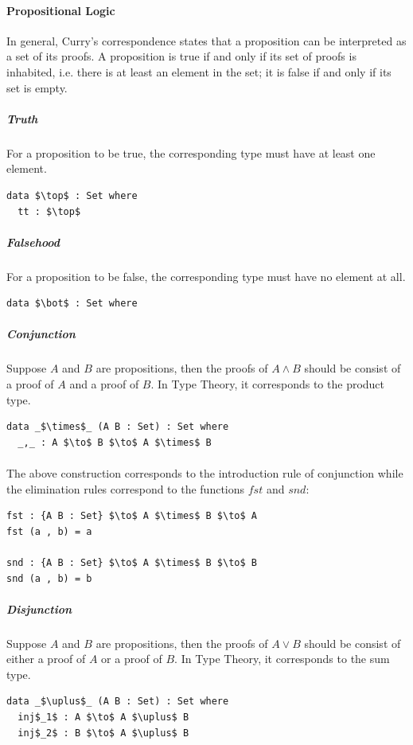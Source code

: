 \documentclass[twoside,openright,final]{bhamthesis}
\begin{document}
\paragraph{Propositional Logic} In general, Curry's correspondence
states that a proposition can be interpreted as a set of its proofs. A
proposition is true if and only if its set of proofs is inhabited,
i.e. there is at least an element in the set; it is false if and only
if its set is empty. 

\subparagraph{Truth} For a proposition to be true, the corresponding
type must have at least one element. 
\begin{lstlisting}[mathescape=true,xleftmargin=.3\textwidth]
data $\top$ : Set where
  tt : $\top$
\end{lstlisting} 

\subparagraph{Falsehood} For a proposition to be false, the corresponding
type must have no element at all. 
\begin{lstlisting}[mathescape=true,xleftmargin=.3\textwidth]
data $\bot$ : Set where
\end{lstlisting} 

\subparagraph{Conjunction} Suppose \(A\) and \(B\) are propositions, then the
proofs of \(A \wedge B\) should be consist of
a proof of \(A\) and a proof of \(B\). In Type Theory, it corresponds
to the product type. 
\begin{lstlisting}[mathescape=true,xleftmargin=.3\textwidth]
data _$\times$_ (A B : Set) : Set where
  _,_ : A $\to$ B $\to$ A $\times$ B
\end{lstlisting} 

\paragraph{} The above construction corresponds to the introduction rule of
conjunction while the elimination rules correspond to the functions
\(fst\) and \(snd\):
\begin{lstlisting}[mathescape=true,xleftmargin=.3\textwidth]
fst : {A B : Set} $\to$ A $\times$ B $\to$ A
fst (a , b) = a

snd : {A B : Set} $\to$ A $\times$ B $\to$ B
snd (a , b) = b
\end{lstlisting} 

\subparagraph{Disjunction} Suppose \(A\) and \(B\) are propositions, then the
proofs of \(A \vee B\) should be consist of either a proof of \(A\) or a
proof of \(B\). In Type Theory, it corresponds
to the sum type. 
\begin{lstlisting}[mathescape=true,xleftmargin=.3\textwidth]
data _$\uplus$_ (A B : Set) : Set where
  inj$_1$ : A $\to$ A $\uplus$ B
  inj$_2$ : B $\to$ A $\uplus$ B
\end{lstlisting} 
\end{document}
